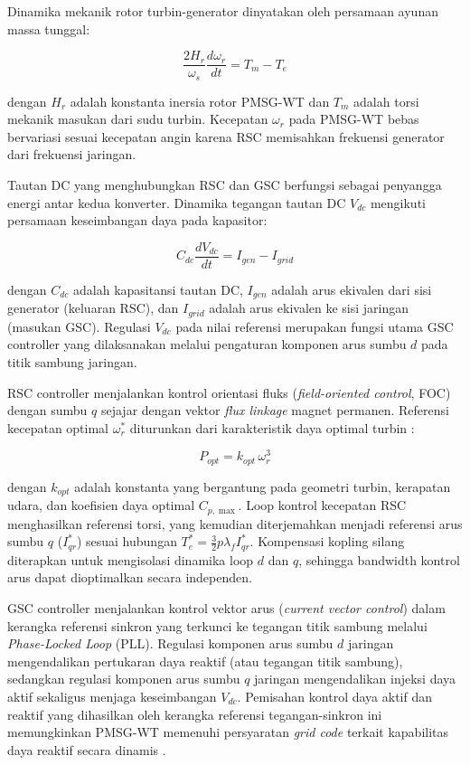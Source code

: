 Dinamika mekanik rotor turbin-generator dinyatakan oleh persamaan ayunan massa
tunggal:

\begin{equation}
  \frac{2H_r}{\omega_s}\frac{d\omega_r}{dt} = T_m - T_e
  \label{eq:pmsg-omega}
\end{equation}

dengan $H_r$ adalah konstanta inersia rotor PMSG-WT dan $T_m$ adalah torsi mekanik
masukan dari sudu turbin. Kecepatan $\omega_r$ pada PMSG-WT bebas bervariasi sesuai kecepatan angin karena
RSC memisahkan frekuensi generator dari frekuensi jaringan.

Tautan DC yang menghubungkan RSC dan GSC berfungsi sebagai penyangga energi antar
kedua konverter. Dinamika tegangan tautan DC $V_{dc}$ mengikuti persamaan
keseimbangan daya pada kapasitor:

\begin{equation}
  C_{dc}\frac{dV_{dc}}{dt} = I_{gen} - I_{grid}
  \label{eq:pmsg-Vdc}
\end{equation}

dengan $C_{dc}$ adalah kapasitansi tautan DC, $I_{gen}$ adalah arus ekivalen dari
sisi generator (keluaran RSC), dan $I_{grid}$ adalah arus ekivalen ke sisi jaringan
(masukan GSC). Regulasi $V_{dc}$ pada nilai referensi merupakan fungsi utama GSC
controller yang dilaksanakan melalui pengaturan komponen arus sumbu $d$ pada titik
sambung jaringan.

RSC controller menjalankan kontrol orientasi fluks (\textit{field-oriented control},
FOC) dengan sumbu $q$ sejajar dengan vektor \textit{flux linkage} magnet permanen.
Referensi kecepatan optimal $\omega_r^*$ diturunkan dari karakteristik daya optimal
turbin \cite{wu2009small}:

\begin{equation}
  P_{opt} = k_{opt}\,\omega_r^3
  \label{eq:pmsg-mppt}
\end{equation}

dengan $k_{opt}$ adalah konstanta yang bergantung pada geometri turbin, kerapatan
udara, dan koefisien daya optimal $C_{p,\max}$. Loop kontrol kecepatan RSC
menghasilkan referensi torsi, yang kemudian diterjemahkan menjadi referensi arus
sumbu $q$ ($I_{qr}^*$) sesuai hubungan $T_e^* = \frac{3}{2}p\lambda_f I_{qr}^*$.
Kompensasi kopling silang diterapkan untuk mengisolasi dinamika loop $d$ dan $q$,
sehingga bandwidth kontrol arus dapat dioptimalkan secara independen.

GSC controller menjalankan kontrol vektor arus (\textit{current vector control})
dalam kerangka referensi sinkron yang terkunci ke tegangan titik sambung melalui
\textit{Phase-Locked Loop} (PLL). Regulasi komponen arus sumbu $d$ jaringan
mengendalikan pertukaran daya reaktif (atau tegangan titik sambung), sedangkan
regulasi komponen arus sumbu $q$ jaringan mengendalikan injeksi daya aktif sekaligus
menjaga keseimbangan $V_{dc}$. Pemisahan kontrol daya aktif dan reaktif yang
dihasilkan oleh kerangka referensi tegangan-sinkron ini memungkinkan PMSG-WT
memenuhi persyaratan \textit{grid code} terkait kapabilitas daya reaktif secara
dinamis \cite{wu2009small}.

